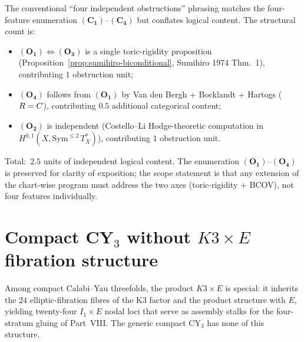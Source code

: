 \begin{remark}
\label{rem:two-and-a-half}
The conventional ``four independent obstructions'' phrasing matches the
four-feature enumeration $(\mathbf{C_1})$--$(\mathbf{C_4})$ but
conflates logical content. The structural count is:
\begin{itemize}[leftmargin=2em]
\item $(\mathbf{O_1}) \Leftrightarrow (\mathbf{O_3})$ is a single
  toric-rigidity proposition (Proposition~\ref{prop:sumihiro-biconditional},
  Sumihiro 1974 Thm.~1), contributing $1$ obstruction unit;
\item $(\mathbf{O_4})$ follows from $(\mathbf{O_1})$ by Van den Bergh
  + Bocklandt + Hartogs ($R = C$), contributing $0.5$ additional
  categorical content;
\item $(\mathbf{O_2})$ is independent (Costello--Li Hodge-theoretic
  computation in $H^{0,1}(X, \mathrm{Sym}^{\leq 2}\,T_X^\ast)$),
  contributing $1$ obstruction unit.
\end{itemize}
Total:\ $2.5$ units of independent logical content. The enumeration
$(\mathbf{O_1})$--$(\mathbf{O_4})$ is preserved for clarity of
exposition; the scope statement is that any extension of the chart-wise
program must address the two axes (toric-rigidity + BCOV), not four
features individually.
\end{remark}

\section{Compact CY$_3$ without $K3 \times E$ fibration structure}
\label{sec:compact-no-fibration}

Among compact Calabi--Yau threefolds, the product $K3 \times E$ is
special: it inherits the $24$ elliptic-fibration fibres of the K3 factor
and the product structure with $E$, yielding twenty-four
$I_1 \times E$ nodal loci that serve as assembly stalks for the
four-stratum gluing of Part~VIII. The generic compact CY$_3$ has none
of this structure.


